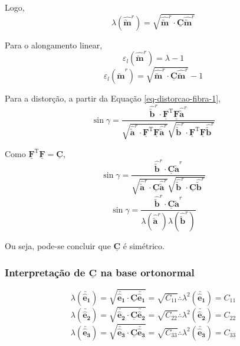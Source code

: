 	Logo,
	\begin{equation}
		\lambda(\hat{\utilde{\mathbf{m}}}^r)=\sqrt{\hat{\utilde{\mathbf{m}}}^r\cdot\underline{\mathbf{C}}\hat{\utilde{\mathbf{m}}}^r}
	\end{equation}
	
	Para o alongamento linear,
	\[\varepsilon_l(\hat{\utilde{\mathbf{m}}}^r)=\lambda-1\]
	\begin{equation}
		\varepsilon_l(\hat{\utilde{\mathbf{m}}}^r)=\sqrt{\hat{\utilde{\mathbf{m}}}^r\cdot\underline{\mathbf{C}}\hat{\utilde{\mathbf{m}}}^r}-1
	\end{equation}
	
	Para a distorção, a partir da Equação \eqref{eq-distorcao-fibra-1},
	\[\sin\gamma=\frac{\hat{\utilde{\mathbf{b}}}^r\cdot\underline{\mathbf{F}}^{\text{T}}\underline{\mathbf{F}}\hat{\utilde{\mathbf{a}}}^r}{\sqrt{\hat{\utilde{\mathbf{a}}}^r\cdot\underline{\mathbf{F}}^{\text{T}}\underline{\mathbf{F}}\hat{\utilde{\mathbf{a}}}^r}\sqrt{\hat{\utilde{\mathbf{b}}}^r\cdot\underline{\mathbf{F}}^{\text{T}}\underline{\mathbf{F}}\hat{\utilde{\mathbf{b}}}^r}}\]
	
	Como $\underline{\mathbf{F}}^{\text{T}}\underline{\mathbf{F}}=\underline{\mathbf{C}}$,
	\[\sin\gamma=\frac{\hat{\utilde{\mathbf{b}}}^r\cdot\underline{\mathbf{C}}\hat{\utilde{\mathbf{a}}}^r}{\sqrt{\hat{\utilde{\mathbf{a}}}^r\cdot\underline{\mathbf{C}}\hat{\utilde{\mathbf{a}}}^r}\sqrt{\hat{\utilde{\mathbf{b}}}^r\cdot\underline{\mathbf{C}}\hat{\utilde{\mathbf{b}}}^r}}\]
	\[\sin\gamma=\frac{\hat{\utilde{\mathbf{b}}}^r\cdot\underline{\mathbf{C}}\hat{\utilde{\mathbf{a}}}^r}{\lambda(\hat{\utilde{\mathbf{a}}}^r)\lambda(\hat{\utilde{\mathbf{b}}}^r)}\]
	
	Ou seja, pode-se concluir que $\underline{\mathbf{C}}$ é simétrico.
	
	\subsubsection{Interpretação de $\underline{\mathbf{C}}$ na base ortonormal}
	\[\lambda(\utilde{\mathbf{\hat{e}_1}})=\sqrt{\utilde{\mathbf{\hat{e}_1}}\cdot\underline{\mathbf{C}}\utilde{\mathbf{\hat{e}_1}}}=\sqrt{C_{11}}\therefore\lambda^2(\utilde{\mathbf{\hat{e}_1}})=C_{11}\]
	\[\lambda(\utilde{\mathbf{\hat{e}_2}})=\sqrt{\utilde{\mathbf{\hat{e}_2}}\cdot\underline{\mathbf{C}}\utilde{\mathbf{\hat{e}_2}}}=\sqrt{C_{22}}\therefore\lambda^2(\utilde{\mathbf{\hat{e}_2}})=C_{22}\]
	\[\lambda(\utilde{\mathbf{\hat{e}_3}})=\sqrt{\utilde{\mathbf{\hat{e}_3}}\cdot\underline{\mathbf{C}}\utilde{\mathbf{\hat{e}_3}}}=\sqrt{C_{33}}\therefore\lambda^2(\utilde{\mathbf{\hat{e}_3}})=C_{33}\]
	
